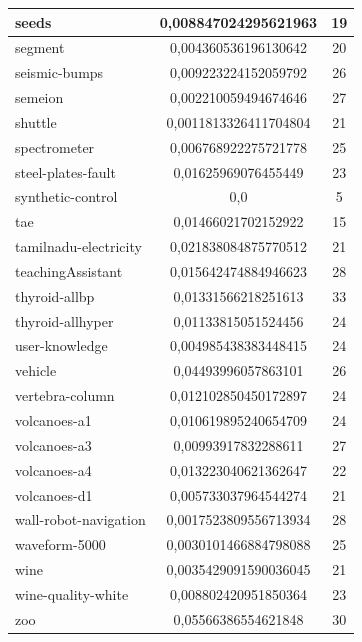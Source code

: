 \documentclass[times,specification,annotation]{itmo-student-thesis}
\begin{document}
\begin{center}
\begin{longtable}{ |m{5cm}|c|c| }
		\hline
		seeds & 0,008847024295621963 & 19 \\
		\hline
		segment & 0,004360536196130642 & 20 \\
		\hline
		seismic-bumps & 0,009223224152059792 & 26 \\
		\hline
		semeion & 0,002210059494674646 & 27 \\
		\hline
		shuttle & 0,0011813326411704804 & 21 \\
		\hline
		spectrometer & 0,006768922275721778 & 25 \\
		\hline
		steel-plates-fault & 0,01625969076455449 & 23 \\
		\hline
		synthetic-control & 0,0 & 5 \\
		\hline
		tae & 0,01466021702152922 & 15 \\
		\hline
		tamilnadu-electricity & 0,021838084875770512 & 21 \\
		\hline
		teachingAssistant & 0,015642474884946623 & 28 \\
		\hline
		thyroid-allbp & 0,01331566218251613 & 33 \\
		\hline
		thyroid-allhyper & 0,01133815051524456 & 24 \\
		\hline
		user-knowledge & 0,004985438383448415 & 24 \\
		\hline
		vehicle & 0,04493996057863101 & 26 \\
		\hline
		vertebra-column & 0,012102850450172897 & 24 \\
		\hline
		volcanoes-a1 & 0,010619895240654709 & 24 \\
		\hline
		volcanoes-a3 & 0,00993917832288611 & 27 \\
		\hline
		volcanoes-a4 & 0,013223040621362647 & 22 \\
		\hline
		volcanoes-d1 & 0,005733037964544274 & 21 \\
		\hline
		wall-robot-navigation & 0,0017523809556713934 & 28 \\
		\hline
		waveform-5000 & 0,0030101466884798088 & 25 \\
		\hline
		wine & 0,0035429091590036045 & 21 \\
		\hline
		wine-quality-white & 0,008802420951850364 & 23 \\
		\hline
		zoo & 0,05566386554621848 & 30 \\
		\hline
	\end{longtable}
\end{center} 
\end{document}
